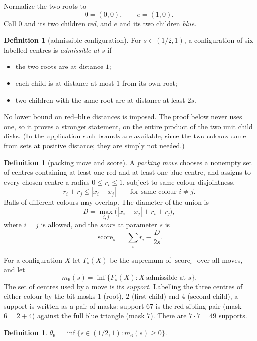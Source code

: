 \documentclass[11pt]{article}
\theoremstyle{plain}
\theoremstyle{definition}
\newtheorem{definition}[theorem]{Definition}
\theoremstyle{remark}
\newcommand{\score}{\operatorname{score}}
\begin{document}
Normalize the two roots to
\[
 0=(0,0),\qquad e=(1,0).
\]
Call $0$ and its two children \emph{red}, and $e$ and its two children
\emph{blue}.

\begin{definition}[admissible configuration]\label{def:admissible}
For $s\in(1/2,1)$, a configuration of six labelled centres is
\emph{admissible at $s$} if
\begin{itemize}
\item the two roots are at distance $1$;
\item each child is at distance at most $1$ from its own root;
\item two children with the same root are at distance at least $2s$.
\end{itemize}
\end{definition}

No lower bound on red--blue distances is imposed.  The proof below never
uses one, so it proves a stronger statement, on the entire product of the
two unit child disks.  (In the application such bounds are available, since
the two colours come from sets at positive distance; they are simply not
needed.)

\begin{definition}[packing move and score]\label{def:score}
A \emph{packing move} chooses a nonempty set of centres containing at least
one red and at least one blue centre, and assigns to every chosen centre a
radius $0\le r_i\le1$, subject to same-colour disjointness,
\[
 r_i+r_j\le|x_i-x_j|\qquad\text{for same-colour }i\ne j .
\]
Balls of different colours may overlap.  The diameter of the union is
\[
 D=\max_{i,j}\bigl(|x_i-x_j|+r_i+r_j\bigr),
\]
where $i=j$ is allowed, and the \emph{score} at parameter $s$ is
\begin{equation}\label{eq:score}
 \score_s=\sum_i r_i-\frac{D}{2s}.
\end{equation}
\end{definition}

For a configuration $X$ let $F_s(X)$ be the supremum of $\score_s$ over all
moves, and let
\[
 m_6(s)=\inf\{F_s(X):X\ \text{admissible at }s\}.
\]
The set of centres used by a move is its \emph{support}.  Labelling the
three centres of either colour by the bit masks $1$ (root), $2$ (first
child) and $4$ (second child), a support is written as a pair of masks:
support $67$ is the red sibling pair (mask $6=2+4$) against the full blue
triangle (mask $7$).  There are $7\cdot7=49$ supports.

\begin{definition}
$\theta_6=\inf\{s\in(1/2,1):m_6(s)\ge0\}$.
\end{definition}
\end{document}
